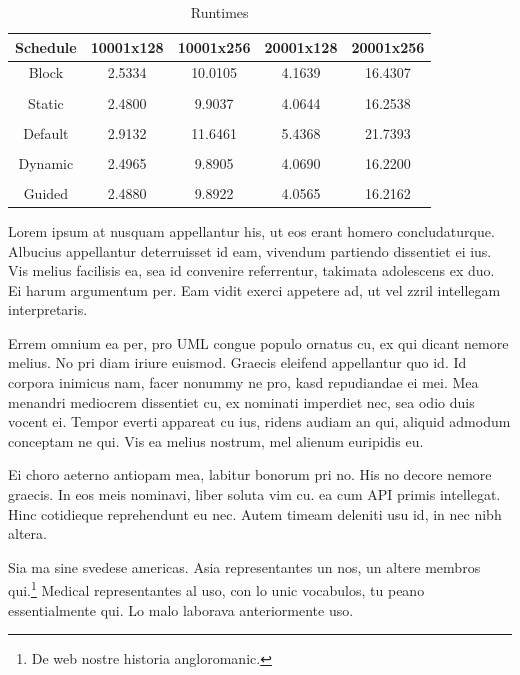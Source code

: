 \begin{table}[t]
\caption{Runtimes}
\begin{center}
   \begin{tabular}{|c|c|c|c|c|}
      \hline
      \textbf{Schedule} & \textbf{10001x128} & \textbf{10001x256} & \textbf{20001x128} & \textbf{20001x256}\\ \hline
      Block & 2.5334 & 10.0105 & 4.1639 & 16.4307 \\ \hline
              & & & & \\ \hline
      Static & 2.4800 & 9.9037 & 4.0644 & 16.2538 \\ \hline
             & & & & \\ \hline
      Default & 2.9132 & 11.6461 & 5.4368 & 21.7393 \\ \hline
              & & & & \\ \hline
      Dynamic & 2.4965 & 9.8905 & 4.0690 & 16.2200 \\ \hline
             & & & & \\ \hline
      Guided & 2.4880 & 9.8922 & 4.0565 & 16.2162 \\ \hline
      \end{tabular}
\end{center}
\end{table}

Lorem ipsum at nusquam appellantur his, ut eos erant homero
concludaturque. Albucius appellantur deterruisset id eam, vivendum
partiendo dissentiet ei ius. Vis melius facilisis ea, sea id convenire
referrentur, takimata adolescens ex duo. Ei harum argumentum per. Eam
vidit exerci appetere ad, ut vel zzril intellegam interpretaris.

Errem omnium ea per, pro \ac{UML} congue populo ornatus cu, ex qui
dicant nemore melius. No pri diam iriure euismod. Graecis eleifend
appellantur quo id. Id corpora inimicus nam, facer nonummy ne pro,
kasd repudiandae ei mei. Mea menandri mediocrem dissentiet cu, ex
nominati imperdiet nec, sea odio duis vocent ei. Tempor everti
appareat cu ius, ridens audiam an qui, aliquid admodum conceptam ne
qui. Vis ea melius nostrum, mel alienum euripidis eu.

Ei choro aeterno antiopam mea, labitur bonorum pri no. His no decore
nemore graecis. In eos meis nominavi, liber soluta vim cu.
ea cum \ac{API} primis intellegat. Hinc cotidieque reprehendunt eu
nec. Autem timeam deleniti usu id, in nec nibh altera.

Sia ma sine svedese americas. Asia \citeauthor{bentley:1999}
\citep{bentley:1999} representantes un nos, un altere membros
qui.\footnote{De web nostre historia angloromanic.} Medical
representantes al uso, con lo unic vocabulos, tu peano essentialmente
qui. Lo malo laborava anteriormente uso.


